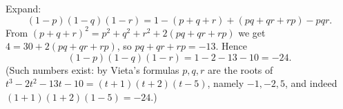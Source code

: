 Expand:
\[
(1-p)(1-q)(1-r)=1-(p+q+r)+(pq+qr+rp)-pqr .
\]
From $(p+q+r)^2=p^2+q^2+r^2+2(pq+qr+rp)$ we get $4=30+2(pq+qr+rp)$, so $pq+qr+rp=-13$. Hence
\[
(1-p)(1-q)(1-r)=1-2-13-10=\boxed{-24}.
\]
(Such numbers exist: by Vieta's formulas $p,q,r$ are the roots of $t^3-2t^2-13t-10=(t+1)(t+2)(t-5)$, namely $-1,-2,5$, and indeed $(1+1)(1+2)(1-5)=-24$.)
